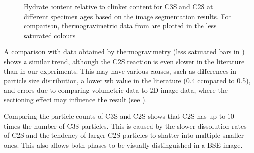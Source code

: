 \begin{figure}[htb]
	\centering
	\caption{%
		Hydrate content relative to clinker content for \ac{C3S} and \ac{C2S} at different specimen ages based on the image segmentation results.
		For comparison, thermogravimetric data from \cite{goni.2010} are plotted in the less saturated colours.
	}
	\label{fig:hydrate_clinker_stacked_bar}
\end{figure}

A comparison with data obtained by thermogravimetry \cite{goni.2010} (less saturated bars in ) shows a similar trend, although the \ac{C2S} reaction is even slower in the literature than in our experiments.
This may have various causes, such as differences in particle size distribution, a lower \ac{wb} value in the literature (\num{0.4} compared to \num{0.5}), and errors due to comparing volumetric data to 2D image data, where the sectioning effect may influence the result (see ).

Comparing the particle counts of \ac{C3S} and \ac{C2S} shows that \ac{C2S} has up to \num{10} times the number of \ac{C3S} particles.
This is caused by the slower dissolution rates of \ac{C2S} and the tendency of larger \ac{C2S} particles to shatter into multiple smaller ones.
This also allows both phases to be visually distinguished in a \ac{BSE} image.

